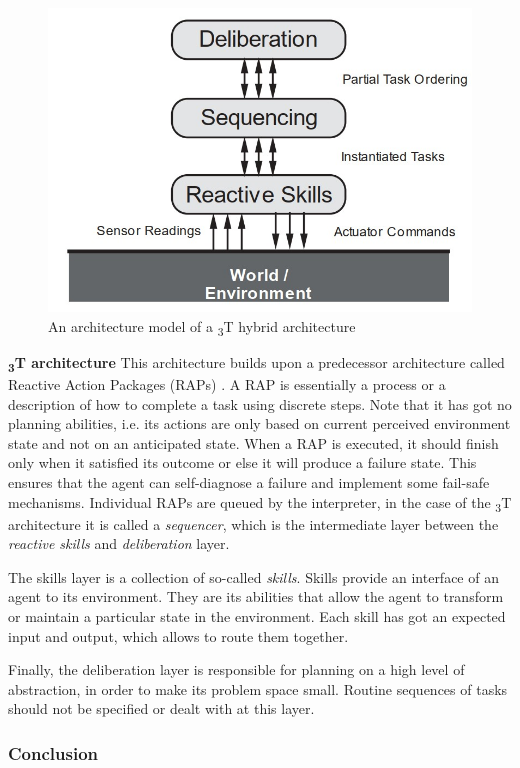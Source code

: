 \documentclass[main.tex]{subfiles}
\begin{document}
\begin{figure}[htbp]
    \centering
    \includegraphics[width=.6\textwidth]{3t-arch.jpg}
    \caption{An architecture model of a \textsubscript{3}T hybrid architecture \cite{Bonasso1995}}
    \label{3-arch}
\end{figure}

\textbf{\textsubscript{3}T architecture}\newline
This architecture builds upon a predecessor architecture called Reactive Action Packages (RAPs)
\cite{Firby1987}. A RAP is essentially a process or a description of how to complete a task using
discrete steps. Note that it has got no planning abilities, i.e. its actions are only based on
current perceived environment state and not on an anticipated state. When a RAP is executed, it
should finish only when it satisfied its outcome or else it will produce a failure state. This
ensures that the agent can self-diagnose a failure and implement some fail-safe mechanisms.
Individual RAPs are queued by the interpreter, in the case of the \textsubscript{3}T architecture it
is called a \emph{sequencer}, which is the intermediate layer between the \emph{reactive skills} and 
\emph{deliberation} layer.

The skills layer is a collection of so-called \emph{skills}. Skills provide an interface of an agent 
to its environment. They are its abilities that allow the agent to transform or maintain a particular 
state in the environment. Each skill has got an expected input and output, which allows to route them 
together. 

Finally, the deliberation layer is responsible for planning on a high level of abstraction, in 
order to make its problem space small. Routine sequences of tasks should not be specified or 
dealt with at this layer. 

\subsubsection{Conclusion}
\end{document}
